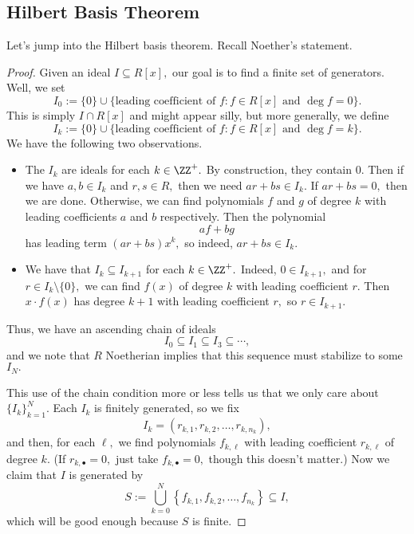 \subsection{Hilbert Basis Theorem}
Let's jump into the Hilbert basis theorem. Recall Noether's statement.
\hilbert*
\begin{proof}
	Given an ideal $I\subseteq R[x],$ our goal is to find a finite set of generators. Well, we set
	\[I_0:=\{0\}\cup\{\text{leading coefficient of }f:f\in R[x]\text{ and }\deg f=0\}.\]
	This is simply $I\cap R[x]$ and might appear silly, but more generally, we define
	\[I_k:=\{0\}\cup\{\text{leading coefficient of }f:f\in R[x]\text{ and }\deg f=k\}.\]
	We have the following two observations.
	\begin{itemize}
		\item The $I_k$ are ideals for each $k\in\ZZ^+.$ By construction, they contain $0.$ Then if we have $a,b\in I_k$ and $r,s\in R,$ then we need $ar+bs\in I_k.$ If $ar+bs=0,$ then we are done. Otherwise, we can find polynomials $f$ and $g$ of degree $k$ with leading coefficients $a$ and $b$ respectively. Then the polynomial
		\[af+bg\]
		has leading term $\left(ar+bs\right)x^k,$ so indeed, $ar+bs\in I_k.$
		\item We have that $I_k\subseteq I_{k+1}$ for each $k\in\ZZ^+.$ Indeed, $0\in I_{k+1},$ and for $r\in I_k\setminus\{0\},$ we can find $f(x)$ of degree $k$ with leading coefficient $r.$ Then $x\cdot f(x)$ has degree $k+1$ with leading coefficient $r,$ so $r\in I_{k+1}.$
	\end{itemize}
	Thus, we have an ascending chain of ideals
	\[I_0\subseteq I_1\subseteq I_3\subseteq\cdots,\]
	and we note that $R$ Noetherian implies that this sequence must stabilize to some $I_N.$

	This use of the chain condition more or less tells us that we only care about $\{I_k\}_{k=1}^N.$ Each $I_k$ is finitely generated, so we fix
	\[I_k=(r_{k,1},r_{k,2},\ldots,r_{k,n_k}),\]
	and then, for each $\ell,$ we find polynomials $f_{k,\ell}$ with leading coefficient $r_{k,\ell}$ of degree $k.$ (If $r_{k,\bullet}=0,$ just take $f_{k,\bullet}=0,$ though this doesn't matter.) Now we claim that $I$ is generated by
	\[S:=\bigcup_{k=0}^N\left\{f_{k,1},f_{k,2},\ldots,f_{n_k}\right\}\subseteq I,\]
	which will be good enough because $S$ is finite.


\end{proof}
